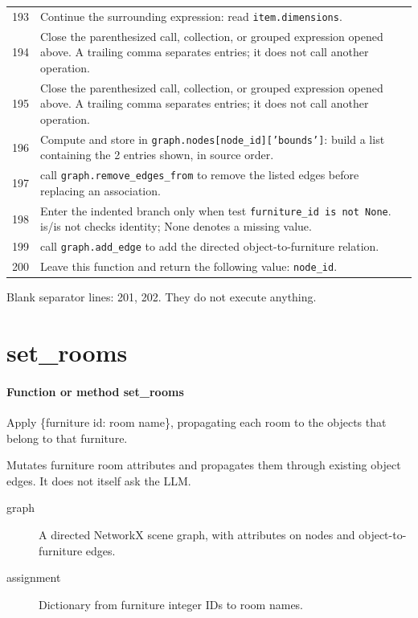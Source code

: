 \documentclass[11pt,a4paper]{book}
\begin{document}
\begin{longtable}{r p{}}
193 & Continue the surrounding expression: read \texttt{item.dimensions}. \\

194 & Close the parenthesized call, collection, or grouped expression opened above. A trailing comma separates entries; it does not call another operation. \\

195 & Close the parenthesized call, collection, or grouped expression opened above. A trailing comma separates entries; it does not call another operation. \\

196 & Compute and store in \texttt{graph.nodes[node\_id]['bounds']}: build a list containing the 2 entries shown, in source order.  \\

197 & call \texttt{graph.remove\_edges\_from} to remove the listed edges before replacing an association. \\

198 & Enter the indented branch only when test \texttt{furniture\_id is not None}. is/is not checks identity; None denotes a missing value. \\

199 & call \texttt{graph.add\_edge} to add the directed object-to-furniture relation. \\

200 & Leave this function and return the following value: \texttt{node\_id}. \\

\end{longtable}

Blank separator lines: 201, 202. They do not execute anything.

\section{set\_rooms}

\paragraph{Function or method set\_rooms}
Apply \{furniture id: room name\}, propagating each room to the objects that belong to that furniture.

Mutates furniture room attributes and propagates them through existing object edges. It does not itself ask the LLM.

\begin{description}
\item[graph] A directed NetworkX scene graph, with attributes on nodes and object-to-furniture edges.
\item[assignment] Dictionary from furniture integer IDs to room names.
\end{description}
\end{document}
